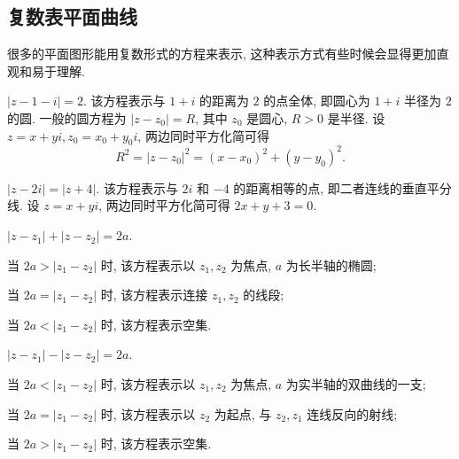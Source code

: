 \subsection{复数表平面曲线}

很多的平面图形能用复数形式的方程来表示, 这种表示方式有些时候会显得更加直观和易于理解.

\begin{example}\delspace
  \begin{enumnopar}[(i)]
    \item $|z-1-i|=2$. 该方程表示与 $1+i$ 的距离为 $2$ 的点全体, 即圆心为 $1+i$ 半径为 $2$ 的圆.
    一般的圆方程为 $|z-z_0|=R$, 其中 $z_0$ 是圆心, $R>0$ 是半径.
    设 $z=x+yi,z_0=x_0+y_0i$, 两边同时平方化简可得
    \[R^2=|z-z_0|^2=(x-x_0)^2+(y-y_0)^2.\]
    \item $|z-2i|=|z+4|$. 该方程表示与 $2i$ 和 $-4$ 的距离相等的点, 即二者连线的垂直平分线.
    设 $z=x+yi$, 两边同时平方化简可得 $2x+y+3=0$.
    \item $|z-z_1|+|z-z_2|=2a$.
    \begin{itempar}
      \item 当 $2a>|z_1-z_2|$ 时, 该方程表示以 $z_1,z_2$ 为焦点, $a$ 为长半轴的椭圆;
      \item 当 $2a=|z_1-z_2|$ 时, 该方程表示连接 $z_1,z_2$ 的线段;
      \item 当 $2a<|z_1-z_2|$ 时, 该方程表示空集.
    \end{itempar}
    \item $|z-z_1|-|z-z_2|=2a$.
    \begin{itempar}
      \item 当 $2a<|z_1-z_2|$ 时, 该方程表示以 $z_1,z_2$ 为焦点, $a$ 为实半轴的双曲线的一支;
      \item 当 $2a=|z_1-z_2|$ 时, 该方程表示以 $z_2$ 为起点, 与 $z_2,z_1$ 连线反向的射线;
      \item 当 $2a>|z_1-z_2|$ 时, 该方程表示空集.
    \end{itempar}
  \end{enumnopar}
\end{example}
